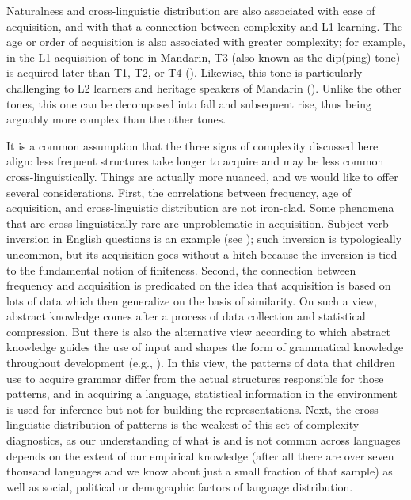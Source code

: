 \documentclass[output=paper,colorlinks,citecolor=brown]{langscibook}
\begin{document}
Naturalness and cross-linguistic distribution are also associated with ease of acquisition, and with that a connection between complexity and L1 learning. The age or order of acquisition is also associated with greater complexity; for example, in the L1 acquisition of tone in Mandarin, T3 (also known as the dip(ping) tone) is acquired later than T1, T2, or T4 (\citealt{LiThompson1977}). Likewise, this tone is particularly challenging to L2 learners and heritage speakers of Mandarin (\citealt{ChanChang2019}). Unlike the other tones, this one can be decomposed into fall and subsequent rise, thus being arguably more complex than the other tones. 

It is a common assumption that the three signs of complexity discussed here align: less frequent structures take longer to acquire and may be less common cross-linguistically. Things are actually more nuanced, and we would like to offer several considerations. First, the correlations between frequency, age of acquisition, and cross-linguistic distribution are not iron-clad. Some phenomena that are cross-linguistically rare are unproblematic in acquisition. Subject-verb inversion in English questions is an example (see \citealt{GrinsteadEtAl2018}); such inversion is typologically uncommon, but its acquisition goes without a hitch because the inversion is tied to the fundamental notion of finiteness. Second, the connection between frequency and acquisition is predicated on the idea that acquisition is based on lots of data which then generalize on the basis of similarity. On such a view, abstract knowledge comes after a process of data collection and statistical compression. But there is also the alternative view according to which abstract knowledge guides the use of input and shapes the form of grammatical knowledge throughout development (e.g., \citealt{Lidz2018}). In this view, the patterns of data that children use to acquire grammar differ from the actual structures responsible for those patterns, and in acquiring a language, statistical information in the environment is used for inference but not for building the representations. Next, the cross-linguistic distribution of patterns is the weakest of this set of complexity diagnostics, as our understanding of what is and is not common across languages depends on the extent of our empirical knowledge (after all there are over seven thousand languages and we know about just a small fraction of that sample) as well as social, political or demographic factors of language distribution. 
\end{document}
